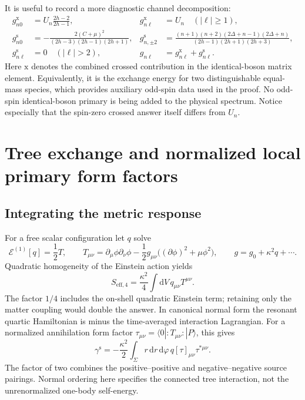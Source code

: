 \documentclass[11pt,a4paper]{article}
\numberwithin{equation}{section}
\theoremstyle{remark}\newtheorem{remark}[theorem]{Remark}
\newcommand{\dd}{\mathrm d}
\newcommand{\kap}{\kappa}
\newcommand{\ket}[1]{|#1\rangle}
\newcommand{\bra}[1]{\langle#1|}
\begin{document}
It is useful to record a more diagnostic channel decomposition:
\begin{align}
 g^{\mathrm x}_{n0}&=U_n\frac{2h-2}{2h-1},&
 g^{\mathrm x}_{n\ell}&=U_n\quad (|\ell|\geq1),\label{eq:crossanswer}\\
 g^{\mathrm s}_{n0}&=-\frac{2(C+\mu)^2}{(2h-3)(2h-1)(2h+1)},&
 g^{\mathrm s}_{n,\pm2}&=\frac{(n+1)(n+2)(2\Delta+n-1)(2\Delta+n)}{(2h-1)(2h+1)(2h+3)},\label{eq:sanswer}\\
 g^{\mathrm s}_{n\ell}&=0\quad(|\ell|>2),&g_{n\ell}&=g^{\mathrm x}_{n\ell}+g^{\mathrm s}_{n\ell}.
\end{align}
Here $\mathrm x$ denotes the combined crossed contribution in the identical-boson matrix element. Equivalently, it is the exchange energy for two distinguishable equal-mass species, which provides auxiliary odd-spin data used in the proof. No odd-spin identical-boson primary is being added to the physical spectrum. Notice especially that the spin-zero crossed answer itself differs from $U_n$.

\section{Tree exchange and normalized local primary form factors}
\label{sec:formfactors}

\subsection{Integrating the metric response}

For a free scalar configuration let $q$ solve
\begin{equation}
 \mathcal E^{(1)}[q]=\frac12T,\qquad
 T_{\mu\nu}=\partial_\mu\phi\partial_\nu\phi
 -\frac12g_{\mu\nu}\bigl((\partial\phi)^2+\mu\phi^2\bigr),
 \qquad g=g_0+\kap^2q+\cdots.
\end{equation}
Quadratic homogeneity of the Einstein action yields
\begin{equation}
 S_{\mathrm{eff},4}=\frac{\kap^2}{4}\int\dd V\,q_{\mu\nu}T^{\mu\nu}.
 \label{eq:effaction}
\end{equation}
The factor $1/4$ includes the on-shell quadratic Einstein term; retaining only the matter coupling would double the answer. In canonical normal form the resonant quartic Hamiltonian is minus the time-averaged interaction Lagrangian. For a normalized annihilation form factor
$\tau_{\mu\nu}=\bra0:T_{\mu\nu}:\ket{P}$, this gives
\begin{equation}
 \gamma^{\mathrm s}=-\frac{\kap^2}{2}
 \int_\Sigma r\,\dd r\,\dd\varphi\,
 q[\tau]_{\mu\nu}\tau^{*\mu\nu}.
 \label{eq:annpairing}
\end{equation}
The factor of two combines the positive--positive and negative--negative source pairings. Normal ordering here specifies the connected tree interaction, not the unrenormalized one-body self-energy.
\end{document}
